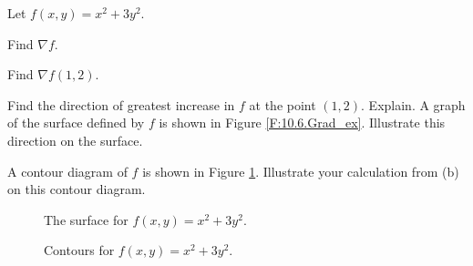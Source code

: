 \begin{activity} \label{A:10.6.6} Let $f(x,y) = x^2+3y^2$.
    \ba
    \item Find $\nabla f$.



    \item Find $\nabla f(1,2)$.



    \item Find the direction of greatest increase in $f$ at the point $(1,2)$. Explain. A graph of the surface defined by $f$ is shown in Figure \ref{F:10.6.Grad_ex}. Illustrate this direction on the surface.



    \item A contour diagram of $f$ is shown in Figure \ref{F:10.6.Grad_ex_contours}. Illustrate your calculation from (b) on this contour diagram.
\begin{figure}[ht]
\begin{center}
\begin{minipage}{2.5in}
\begin{center}
\end{center}
\caption{The surface for $f(x,y) = x^2+3y^2$.}
\label{F:10.6.Grad_ex}
\end{minipage} \hspace{0.5in}
\begin{minipage}{2.5in}
\begin{center}
\end{center}
\caption{Contours for $f(x,y) = x^2+3y^2$.}
\label{F:10.6.Grad_ex_contours}
\end{minipage}
\end{center}
\end{figure}



    \ea


\end{activity}
\begin{smallhint}

\end{smallhint}
\begin{bighint}

\end{bighint}
